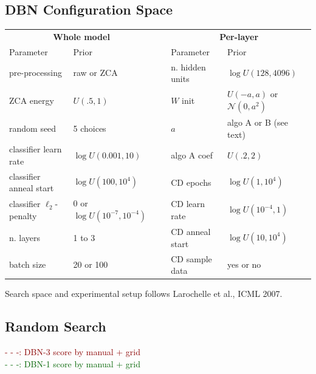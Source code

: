 \documentclass[12pt]{scrartcl}
\begin{document}
\vspace{-1.5em}
\subsection{DBN Configuration Space}

{\footnotesize

    \begin{tabular}{llp{0in}ll}
        \multicolumn{2}{c}{{\bf Whole model}} & & \multicolumn{2}{c}{\bf Per-layer} \\
        Parameter & Prior & & Parameter & Prior \\
        \hline
        pre-processing & raw or ZCA & & n. hidden units & $\log U(128, 4096)$\\
        ZCA energy & $U(.5, 1)$ & & $W$ init & $U(-a,a)$ or $\mathcal{N}(0, a^2)$ \\
        random seed & 5 choices & & $a$ & algo A or B (see text)\\
        classifier learn rate & $\log U(0.001, 10)$ & & algo A coef& $U(.2,2)$\\
        classifier anneal start & $\log U(100, 10^4)$ & & CD epochs & $\log U(1, 10^4)$\\
        classifier $\ell_2$-penalty & 0 or $\log U(10^{-7}, 10^{-4})$ & & CD learn rate & $\log U(10^{-4},1)$ \\
        n. layers & 1 to 3 & & CD anneal start & $\log U(10, 10^4)$ \\
        batch size & 20 or 100 & & CD sample data & yes or no \\
        \hline
    \end{tabular}
    }

Search space and experimental setup follows Larochelle et al., ICML 2007.

\vspace{-1em}
\subsection{Random Search}

\vspace{-3em}

\hspace{3.6in}\begin{minipage}[l]{2in}
\scriptsize
\textcolor{darkred}{- - -: DBN-3 score by manual + grid}\\
\textcolor{darkgreen}{- - -: DBN-1 score by manual + grid}

\end{minipage}
\end{document}

